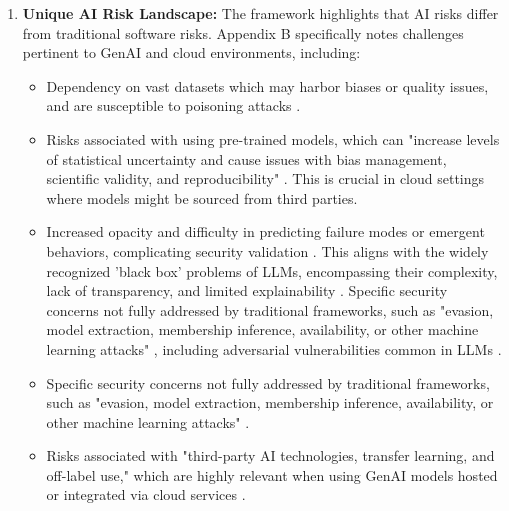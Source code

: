 \begin{enumerate}
    \item \textbf{Unique AI Risk Landscape:} The framework highlights that AI risks differ from traditional software risks. Appendix B specifically notes challenges pertinent to GenAI and cloud environments, including:
    \begin{itemize}
        \item Dependency on vast datasets which may harbor biases or quality issues, and are susceptible to poisoning attacks \cite{tabassi_artificial_2023}.
        \item Risks associated with using pre-trained models, which can "increase levels of statistical uncertainty and cause issues with bias management, scientific validity, and reproducibility" \cite[p.38]{tabassi_artificial_2023}. This is crucial in cloud settings where models might be sourced from third parties.
        \item Increased opacity and difficulty in predicting failure modes or emergent behaviors, complicating security validation \cite{tabassi_artificial_2023}. This aligns with the widely recognized 'black box' problems of LLMs, encompassing their complexity, lack of transparency, and limited explainability \cite{noauthor_zero-trust_nodate}. Specific security concerns not fully addressed by traditional frameworks, such as "evasion, model extraction, membership inference, availability, or other machine learning attacks" \cite[p.39]{tabassi_artificial_2023}, including adversarial vulnerabilities common in LLMs \cite{noauthor_zero-trust_nodate}.
        \item Specific security concerns not fully addressed by traditional frameworks, such as "evasion, model extraction, membership inference, availability, or other machine learning attacks" \cite[p.39]{tabassi_artificial_2023}.
        \item Risks associated with "third-party AI technologies, transfer learning, and off-label use," which are highly relevant when using GenAI models hosted or integrated via cloud services \cite[p.39]{tabassi_artificial_2023}.
    \end{itemize}


\end{enumerate}
